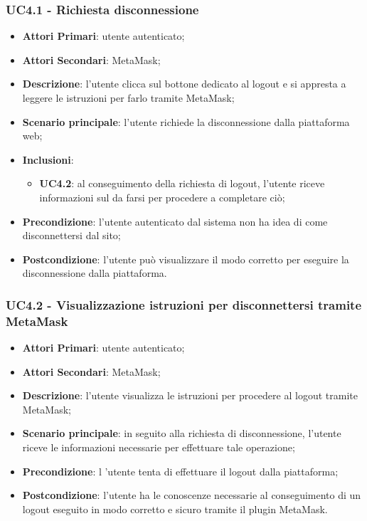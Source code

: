 \subsubsection{UC4.1 - Richiesta disconnessione}
\begin{itemize}
	\item \textbf{Attori Primari}:
	utente autenticato;
	\item \textbf{Attori Secondari}:
	MetaMask\glo;
	\item \textbf{Descrizione}: l'utente clicca sul bottone dedicato al logout e si appresta a leggere le istruzioni per farlo tramite MetaMask\glo;
	\item \textbf{Scenario principale}: l'utente richiede la disconnessione dalla piattaforma web;
	\item \textbf{Inclusioni}:
	\begin{itemize}
		\item \textbf{UC4.2}: al conseguimento della richiesta di logout, l'utente riceve informazioni sul da farsi per procedere a completare ciò;
	\end{itemize}
	\item \textbf{Precondizione}: l'utente autenticato dal sistema non ha idea di come disconnettersi dal sito;
	\item \textbf{Postcondizione}: l'utente può visualizzare il modo corretto per eseguire la disconnessione dalla piattaforma.
	
\end{itemize}
\subsubsection{UC4.2 - Visualizzazione istruzioni per disconnettersi tramite MetaMask\glosp}
\begin{itemize}
	\item \textbf{Attori Primari}:
	utente autenticato;
	\item \textbf{Attori Secondari}:
	MetaMask\glo;
	\item \textbf{Descrizione}: l'utente visualizza le istruzioni per procedere al logout tramite MetaMask\glo;
	\item \textbf{Scenario principale}: in seguito alla richiesta di disconnessione, l'utente riceve le informazioni necessarie per effettuare tale operazione;
	
	\item \textbf{Precondizione}: l 'utente tenta di effettuare il logout dalla piattaforma;
	\item \textbf{Postcondizione}: l'utente ha le conoscenze necessarie al conseguimento di un logout eseguito in modo corretto e sicuro tramite il plugin MetaMask\glo.
\end{itemize} 
